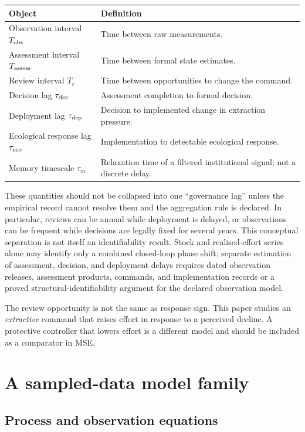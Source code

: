 \documentclass[11pt]{article}
\begin{document}
\begin{center}
\begin{tabularx}{\textwidth}{p{3.5cm}X}
\toprule
Object & Definition\\
\midrule
Observation interval $T_{\rm obs}$ & Time between raw measurements.\\
Assessment interval $T_{\rm assess}$ & Time between formal state estimates.\\
Review interval $T_r$ & Time between opportunities to change the command.\\
Decision lag $\tau_{\rm dec}$ & Assessment completion to formal decision.\\
Deployment lag $\tau_{\rm dep}$ & Decision to implemented change in extraction pressure.\\
Ecological response lag $\tau_{\rm eco}$ & Implementation to detectable ecological response.\\
Memory timescale $\tau_m$ & Relaxation time of a filtered institutional signal; not a discrete delay.\\
\bottomrule
\end{tabularx}
\end{center}

These quantities should not be collapsed into one ``governance lag'' unless the empirical record cannot resolve them and the aggregation rule is declared. In particular, reviews can be annual while deployment is delayed, or observations can be frequent while decisions are legally fixed for several years. This conceptual separation is not itself an identifiability result. Stock and realised-effort series alone may identify only a combined closed-loop phase shift; separate estimation of assessment, decision, and deployment delays requires dated observation releases, assessment products, commands, and implementation records or a proved structural-identifiability argument for the declared observation model.

The review opportunity is not the same as response sign. This paper studies an \emph{extractive} command that raises effort in response to a perceived decline. A protective controller that lowers effort is a different model and should be included as a comparator in MSE.

\section{A sampled-data model family}

\subsection{Process and observation equations}
\end{document}
